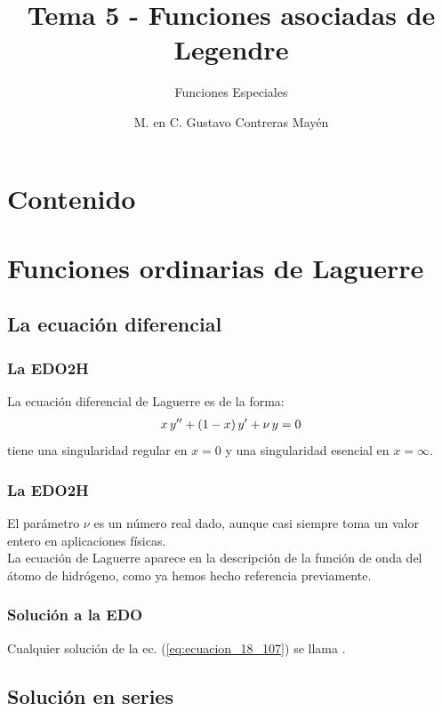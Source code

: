 \documentclass[12pt]{beamer}
\date{}
\title{\large{Tema 5 - Funciones asociadas de Legendre}}
\subtitle{Funciones Especiales }
\author{M. en C. Gustavo Contreras Mayén}
\begin{document}
\maketitle
\fontsize{14}{14}\selectfont
{}

\section*{Contenido}


\section{Funciones ordinarias de Laguerre}\label{sec:seccion_01}
\subsection{La ecuación diferencial}

\begin{frame}
\frametitle{La EDO2H}
La ecuación diferencial de Laguerre es de la forma:
\pause
\begin{align}
x \, {y}^{\prime \prime} + (1 - x) \, {y}^{\prime} + \nu \, y = 0
\label{eq:ecuacion_18_107}
\end{align}
tiene una singularidad regular en $x = 0$ y una singularidad esencial en $x = \infty$.
\end{frame}
\begin{frame}
\frametitle{La EDO2H}
El parámetro $\nu$ es un número real dado, \pause aunque casi siempre toma un valor entero en aplicaciones físicas. 
\\
\bigskip
\pause
La ecuación de Laguerre aparece en la descripción de la función de onda del átomo de hidrógeno, como ya hemos hecho referencia previamente.
\end{frame}
\begin{frame}
\frametitle{Solución a la EDO}
Cualquier solución de la ec. (\ref{eq:ecuacion_18_107}) se llama .
\end{frame}

\subsection{Solución en series}
\end{document}
